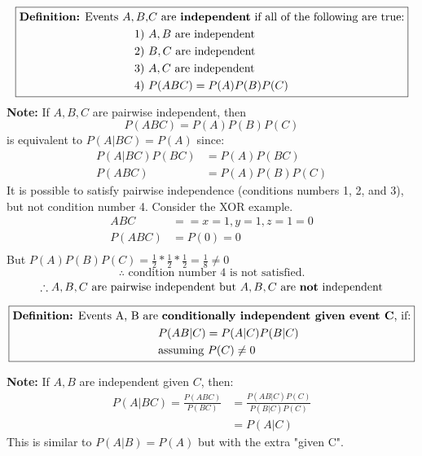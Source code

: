 \documentclass[10pt]{article}
\begin{document}
\begin{flushleft}
$$ \boxed{ \begin{aligned}
        \text{\textbf{Definition:} Events } A, B, &C \text{ are \textbf{independent}
if all of the following are true:}  \\
        1) \text{ } &A, B \text{ are independent} \\
        2) \text{ } &B, C \text{ are independent} \\
    3) \text{ } &A, C \text{ are independent} \\
    4) \text{ } &P(ABC) = P(A)P(B)P(C)
\end{aligned} }$$
\textbf{Note:} If $A,B,C$ are pairwise independent, then
$$ P(ABC) = P(A)P(B)P(C) $$
is equivalent to $P(A|BC) = P(A)$ since:
$$ \begin{aligned}
    P(A|BC)P(BC) &= P(A)P(BC) \\
    P(ABC) &= P(A)P(B)P(C)
\end{aligned} $$
It is possible to satisfy pairwise independence (conditions numbers 1, 2, and
3), but not condition number 4. Consider the XOR example.
$$ \begin{aligned}
    ABC &== x = 1, y = 1, z = 1 = 0 \\
    P(ABC) &= P(0) = 0 \\
\end{aligned} $$
But $P(A)P(B)P(C) = \frac{1}{2} * \frac{1}{2} * \frac{1}{2} = \frac{1}{8} \neq
0$\\
$$ \therefore \text{ condition number 4 is not satisfied.}$$
$$ \therefore A, B, C \text{ are pairwise independent but } A, B, C \text{ are
\textbf{not} independent} $$

$$ \boxed{ \begin{aligned}
        \text{\textbf{Definition:} Events A, B are} &\text{ \textbf{conditionally
    independent given event C}, if:} \\
                                                    &P(AB|C) = P(A|C)P(B|C) \\
                                                    &\text{assuming  } P(C) \neq 0 \\
\end{aligned}} $$

\textbf{Note:} If $A, B$ are independent given $C$, then:
$$ \begin{aligned}
    P(A|BC) = \frac{P(ABC)}{P(BC)} &= \frac{P(AB|C)P(C)}{P(B|C)P(C)} \\
                                   &= P(A|C)
\end{aligned}$$
This is similar to $P(A|B) = P(A)$ but with the extra "given C".


\end{flushleft}
\end{document}
